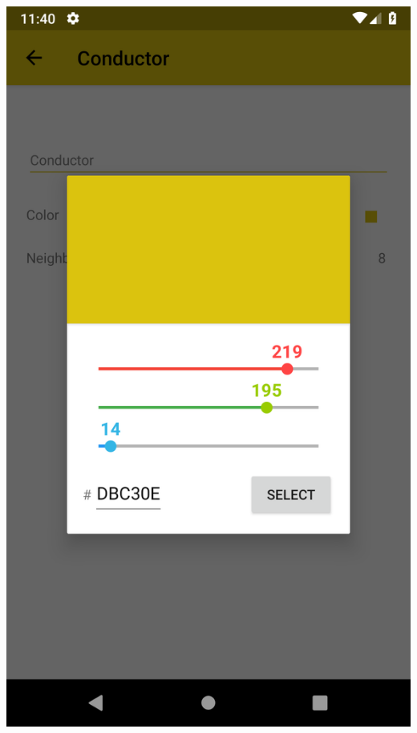 \documentclass{report}
\begin{document}
\begin{minipage}{.45\textwidth}
  \begin{minipage}{.45\linewidth}
    \includegraphics[width=\linewidth]{screens/cell_edit.png}
  \end{minipage}\hfill
  \begin{minipage}{.45\linewidth}

\end{minipage}
\end{minipage}
\end{document}
